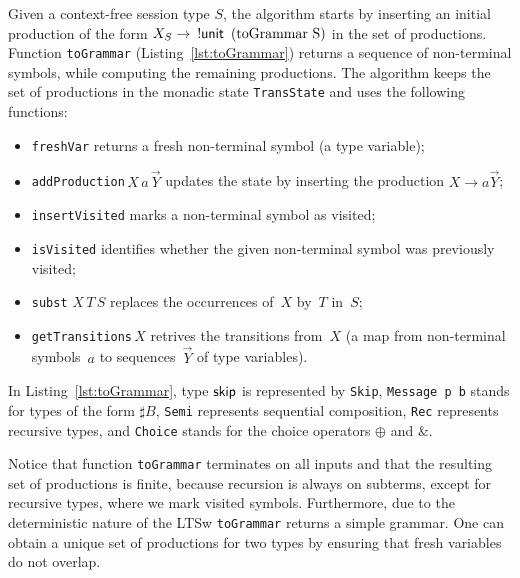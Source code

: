 Given a context-free session type $S$, the algorithm starts by
inserting an initial production of the form
$X_S \rightarrow \enspace\initialProd\enspace
\text{(\lstinline{toGrammar} S)}$ in the set of productions.
%
Function \lstinline|toGrammar| (Listing~\ref{lst:toGrammar}) returns a
sequence of non-terminal symbols, while computing the remaining
productions.
%
%
The algorithm keeps the set of productions in the monadic state
\lstinline{TransState} and uses the following functions:
\begin{itemize}
\item \lstinline{freshVar} returns a fresh non-terminal symbol (a type
  variable);
\item \lstinline{addProduction}$\,X\,a\,\vec Y$ updates the state by inserting
  the production $X\rightarrow a\vec Y$;
\item \lstinline{insertVisited} marks a non-terminal symbol as visited;
\item \lstinline{isVisited} identifies whether the given non-terminal symbol
  was previously visited;
\item \lstinline{subst} $X\,T\,S$ replaces the occurrences of~$X$
  by~$T$ in~$S$;
\item \lstinline|getTransitions|$\,X$ retrives the transitions
  from~$X$ (a map from non-terminal symbols~$a$ to sequences~$\vec Y$
  of type variables).
\end{itemize}

In Listing~\ref{lst:toGrammar}, type $\mathsf{skip}$ is represented by
\lstinline{Skip}, \lstinline{Message p b} stands for types of the form
$\sharp B$,
\lstinline{Semi} represents sequential composition,
\lstinline{Rec} represents recursive types, and
\lstinline{Choice} stands for the choice operators $\oplus$ and
$\&$. 



Notice that function \lstinline|toGrammar| terminates on all inputs and
that the resulting set of productions is finite, because recursion is
always on subterms, except for recursive types, where we mark visited
symbols.
%
Furthermore, due to the deterministic nature of the LTSw
\lstinline|toGrammar| returns a simple grammar.
%
%
One can obtain a unique set of productions for two types by
ensuring that fresh variables do not overlap.

